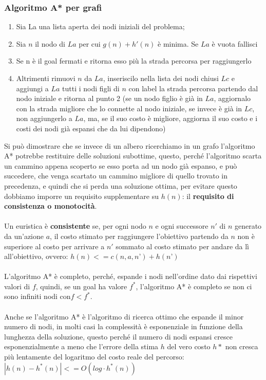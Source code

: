 \documentclass[../main.tex]{subfiles}
\begin{document}
	\subsubsection{Algoritmo A* per grafi}
	\begin{enumerate}
		\item Sia La una lista aperta dei nodi iniziali del problema;
		\item Sia $n$ il nodo di $La$ per cui $g(n) + h'(n)$ è minima. Se $La$ è vuota fallisci
		\item Se n è il goal fermati e ritorna esso più la strada percorsa per raggiungerlo
		\item Altrimenti rimuovi $n$ da $La$, inseriscilo nella lista dei nodi chiusi $Lc$ e aggiungi a $La$ tutti i nodi figli di $n$ con label la strada percorsa partendo dal nodo iniziale e ritorna al punto 2 (se un nodo figlio è già in $La$, aggiornalo con la strada migliore che lo connette al nodo iniziale, se invece è già in $Lc$, non aggiungerlo a $La$, ma, se il suo costo è migliore, aggiorna il suo costo e i costi dei nodi già espansi che da lui dipendono)
	\end{enumerate}
	Si può dimostrare che se invece di un albero ricerchiamo in un grafo l'algoritmo A* potrebbe restituire delle soluzioni subottime, questo, perché l'algoritmo scarta un cammino appena scoperto se esso porta ad un nodo già espanso, e può succedere, che venga scartato un cammino migliore di quello trovato in precedenza, e quindi che si perda una soluzione ottima, per evitare questo dobbiamo imporre un requisito supplementare su $h(n)$: il \textbf{requisito di consistenza o monotocità}.\\ \\
	Un euristica è \textbf{consistente} se, per ogni nodo $n$ e ogni successore $n'$ di $n$ generato da un'azione $a$, il costo stimato per raggiungere l'obiettivo partendo da $n$ non è superiore al costo per arrivare a $n'$ sommato al costo stimato per andare da lì all'obiettivo, ovvero: $h(n)<= c(n,a,n’)+h(n’)$ \\ \\
	L'algoritmo A* è completo, perché, espande i nodi nell'ordine dato dai rispettivi valori di $f$, quindi, se un goal ha valore $f^*$, l'algoritmo A* è completo se non ci sono infiniti nodi con$ f < f^*$.\\ \\
	Anche se l'algoritmo A* è l'algoritmo di ricerca ottimo che espande il minor numero di nodi, in molti casi la complessità è esponenziale in funzione della lunghezza della soluzione, questo perché il numero di nodi espansi cresce esponenzialmente a meno che l'errore della stima $h$ del vero costo $h*$ non cresca più lentamente del logaritmo del costo reale del percorso: $|h(n) - h^*(n)| <= O(log \cdot h^*(n))$
\end{document}
